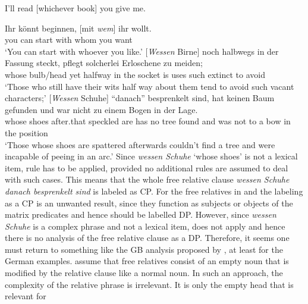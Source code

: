 \ea
I'll read [whichever book] you give me.
\z

\eal
 \ex 
\gll Ihr könnt beginnen, [mit  \emph{wem}] ihr wollt.\footnotemark\\
     you can    start    \hspaceThis{[}with whom you want\\
\glt `You can start with whoever you like.'
\ex 
\gll {}[\emph{Wessen}      Birne]    noch halbwegs in der Fassung steckt, pflegt solcherlei Erloschene zu meiden;\footnotemark\\
       \hspaceThis{[}whose bulb/head yet  halfway  in the socket  is      uses  such       extinct    to avoid\\
\glt `Those who still have their wits half way about them tend to avoid such vacant characters;'
\ex 
\gll {}[\emph{Wessen} Schuhe] "`danach"'  besprenkelt sind, hat keinen Baum gefunden und war nicht zu einem Bogen in der Lage.\footnotemark\\
       \hspaceThis{[}whose    shoes   after.that speckled    are   has no     tree found    and was not   to a     bow   in the position\\
\glt `Those whose shoes are spattered afterwards couldn't find a tree and were incapable of peeing in an arc.'
\zl
%
\largerpage
Since \emph{wessen Schuhe} `whose shoes' is not a lexical item, rule  has to be
applied, provided no additional rules are assumed to deal with such cases. This means that the whole
free relative clause \emph{wessen Schuhe danach besprenkelt sind} is labeled as CP. For the free
relatives in  and  the labeling as a CP is an unwanted result, since they
function as subjects or objects of the matrix predicates and hence should be labelled DP. However,
since \emph{wessen Schuhe} is a complex phrase and not a lexical item,  does not apply
and hence there is no analysis of the free relative clause as a DP. Therefore, it seems one must return to something like the GB analysis proposed by \citet{GR81a}, at least for the German
examples. \citeauthor{GR81a} assume that free relatives consist of an empty noun that is
modified by the relative clause like a normal noun. In such an approach, the complexity of the relative phrase is irrelevant. It is only the empty head that is relevant for
